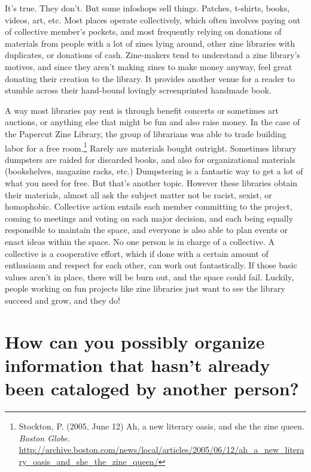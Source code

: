 \documentclass[output=paper]{langscibook}
\begin{document}
It's true. They don't. But some infoshops sell things. Patches,
t-shirts, books, videos, art, etc. Most places operate collectively,
which often involves paying out of collective member's pockets, and most
frequently relying on donations of materials from people with a lot of
zines lying around, other zine libraries with duplicates, or donations
of cash. Zine-makers tend to understand a zine library's motives, and
since they aren't making zines to make money anyway, feel great donating
their creation to the library. It provides another venue for a reader to
stumble across their hand-bound lovingly screenprinted handmade book.

A way most libraries pay rent is through benefit concerts or sometimes
art auctions, or anything else that might be fun and also raise money.
In the case of the Papercut Zine Library, the group of librarians was
able to trade building labor for a free room.\footnote{Stockton, P.
  (2005, June 12) Ah, a new literary oasis, and she the zine queen.
  \emph{Boston Globe}.
  \url{http://archive.boston.com/news/local/articles/2005/06/12/ah_a_new_literary_oasis_and_she_the_zine_queen/}}
Rarely are materials bought outright. Sometimes library dumpsters are
raided for discarded books, and also for organizational materials
(bookshelves, magazine racks, etc.) Dumpstering is a fantastic way to
get a lot of what you need for free. But that's another topic. However
these libraries obtain their materials, almost all ask the subject
matter not be racist, sexist, or homophobic. Collective action entails
each member committing to the project, coming to meetings and voting on
each major decision, and each being equally responsible to maintain the
space, and everyone is also able to plan events or enact ideas within
the space. No one person is in charge of a collective. A collective is a
cooperative effort, which if done with a certain amount of enthusiasm
and respect for each other, can work out fantastically. If those basic
values aren't in place, there will be burn out, and the space could
fail. Luckily, people working on fun projects like zine libraries just
want to see the library succeed and grow, and they do!

\hypertarget{how-can-you-possibly-organize-information-that-hasnt-already-been-cataloged-by-another-person}{%
\section{How can you possibly organize information that hasn't already
been cataloged by another
person?}\label{how-can-you-possibly-organize-information-that-hasnt-already-been-cataloged-by-another-person}}
\end{document}
